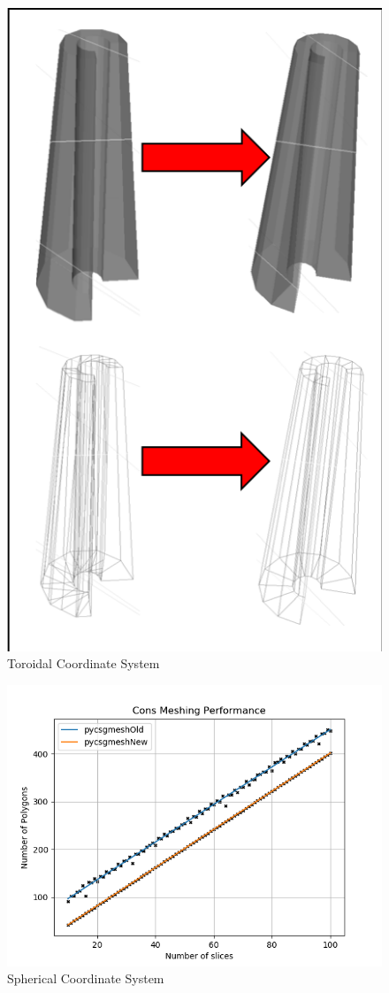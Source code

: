 \documentclass[12pt,a4paper]{article}
\begin{document}
\begin{figure}[h!]
\centering
\includegraphics[scale=0.5]{Images//Meshes//cons.png}
\caption[width=\columnwidth]{Toroidal Coordinate System}
\label{cons}
\end{figure}

\begin{figure}[h!]
\centering
\includegraphics[scale=0.5]{Images//Quad_fits//Cons_quad.png}
\caption[width=\columnwidth]{Spherical Coordinate System}
\label{conts}
\end{figure}
\end{document}

